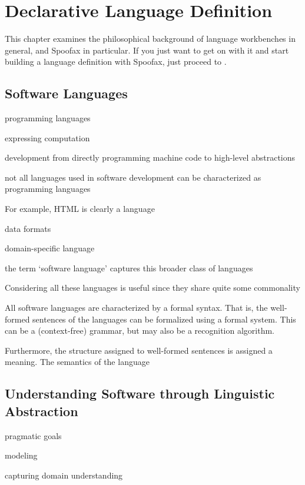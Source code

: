 \newpage
\chapter{Declarative Language Definition}

This chapter examines the philosophical background of language workbenches in
general, and Spoofax in particular.
If you just want to get on with it and start building a
language definition with Spoofax, just proceed to .

\section{Software Languages}

programming languages

expressing computation

development from directly programming machine code to high-level abstractions

not all languages used in software development can be characterized as
programming languages

For example, HTML is clearly a language 

data formats

domain-specific language

the term `software language' captures this broader class of languages 

Considering all these languages is useful since they share quite some
commonality

All software languages are characterized by a formal syntax. That is, the
well-formed sentences of the languages can be formalized using a formal
system. This can be a (context-free) grammar, but may also be a recognition
algorithm.

Furthermore, the structure assigned to well-formed sentences is assigned a
meaning. The semantics of the language

\section{Understanding Software through Linguistic Abstraction}

pragmatic goals

modeling

capturing domain understanding

\section{}

